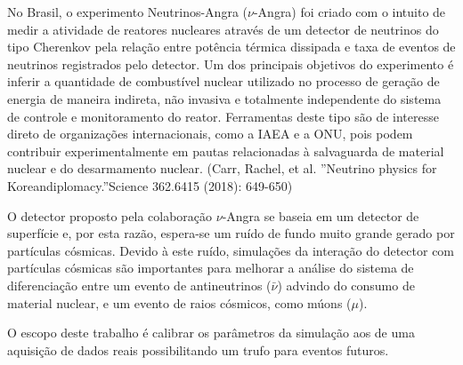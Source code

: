 No Brasil, o experimento Neutrinos-Angra ($\nu$-Angra) foi criado com o intuito de medir a atividade de reatores nucleares através de um detector de neutrinos do tipo Cherenkov pela relação entre potência térmica dissipada e taxa de eventos de neutrinos registrados pelo detector. Um dos principais objetivos do experimento é inferir a quantidade de combustível nuclear utilizado no processo de geração de energia de maneira indireta, não invasiva e totalmente independente do sistema de controle e monitoramento do reator. Ferramentas deste tipo são de interesse direto de organizações internacionais, como a IAEA e a ONU, pois podem contribuir experimentalmente em pautas relacionadas à salvaguarda de material nuclear e do desarmamento nuclear. (Carr, Rachel, et al. ”Neutrino physics for Koreandiplomacy.”Science 362.6415 (2018): 649-650)

O detector proposto pela colaboração $\nu$-Angra se baseia em um detector de superfície e, por esta razão, espera-se um ruído de fundo muito grande gerado por partículas cósmicas. Devido à este ruído, simulações da interação do detector com partículas cósmicas são importantes para melhorar a análise do sistema de diferenciação entre um evento de antineutrinos ($\bar{\nu}$) advindo do consumo de material nuclear, e um evento de raios cósmicos, como múons ($\mu$). 

O escopo deste trabalho é calibrar os parâmetros da simulação aos de uma aquisição de dados reais possibilitando um trufo para eventos futuros.


%
%
%
%

